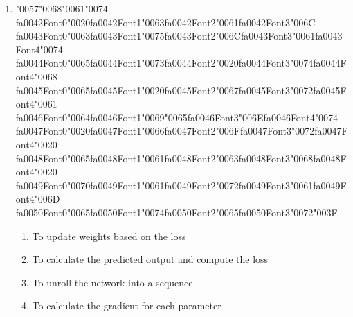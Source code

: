\documentclass[12pt]{article}
\begin{document}
\begin{enumerate}[label=Q\arabic*.]
\item {\char"0057}{\char"0068}{\char"0061}{\char"0074} {\csname fa0042Font0\endcsname\char"0020}{\csname fa0042Font1\endcsname\char"0063}{\csname fa0042Font2\endcsname\char"0061}{\csname fa0042Font3\endcsname\char"006C} {\csname fa0043Font0\endcsname\char"0063}{\csname fa0043Font1\endcsname\char"0075}{\csname fa0043Font2\endcsname\char"006C}{\csname fa0043Font3\endcsname\char"0061}{\csname fa0043Font4\endcsname\char"0074} {\csname fa0044Font0\endcsname\char"0065}{\csname fa0044Font1\endcsname\char"0073}{\csname fa0044Font2\endcsname\char"0020}{\csname fa0044Font3\endcsname\char"0074}{\csname fa0044Font4\endcsname\char"0068} {\csname fa0045Font0\endcsname\char"0065}{\csname fa0045Font1\endcsname\char"0020}{\csname fa0045Font2\endcsname\char"0067}{\csname fa0045Font3\endcsname\char"0072}{\csname fa0045Font4\endcsname\char"0061} {\csname fa0046Font0\endcsname\char"0064}{\csname fa0046Font1\endcsname\char"0069}{\char"0065}{\csname fa0046Font3\endcsname\char"006E}{\csname fa0046Font4\endcsname\char"0074} {\csname fa0047Font0\endcsname\char"0020}{\csname fa0047Font1\endcsname\char"0066}{\csname fa0047Font2\endcsname\char"006F}{\csname fa0047Font3\endcsname\char"0072}{\csname fa0047Font4\endcsname\char"0020} {\csname fa0048Font0\endcsname\char"0065}{\csname fa0048Font1\endcsname\char"0061}{\csname fa0048Font2\endcsname\char"0063}{\csname fa0048Font3\endcsname\char"0068}{\csname fa0048Font4\endcsname\char"0020} {\csname fa0049Font0\endcsname\char"0070}{\csname fa0049Font1\endcsname\char"0061}{\csname fa0049Font2\endcsname\char"0072}{\csname fa0049Font3\endcsname\char"0061}{\csname fa0049Font4\endcsname\char"006D} {\csname fa0050Font0\endcsname\char"0065}{\csname fa0050Font1\endcsname\char"0074}{\csname fa0050Font2\endcsname\char"0065}{\csname fa0050Font3\endcsname\char"0072}{\char"003F}
\begin{enumerate}[label=(\Alph*)]
    \item To update weights based on the loss
    \item To calculate the predicted output and compute the loss
    \item To unroll the network into a sequence
    \item To calculate the gradient for each parameter
\end{enumerate}

\end{enumerate}
\end{document}
